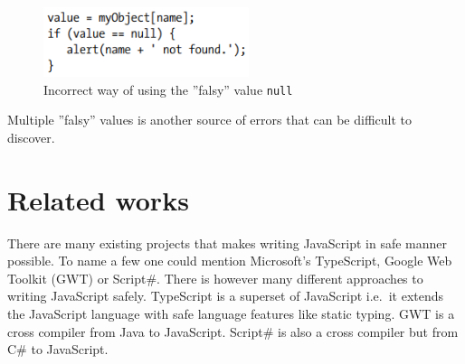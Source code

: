 					\begin{figure}[H]
				\begin{center}
					\centerline{\includegraphics[width=6cm]{resources/images/FalsyExample.png}}
				\end{center}
				\caption{Incorrect way of using the ''falsy'' value \texttt{null} \cite{good_parts}}
				\label{falsyExample}
			\end{figure}

		Multiple ''falsy'' values is another source of errors that can be difficult to discover.

\section{Related works} %
\label{sec:related_works}
	There are many existing projects that makes writing JavaScript in safe manner possible. To name a few one could mention Microsoft’s TypeScript, Google Web Toolkit (GWT) or Script\#. There is however many different approaches to writing JavaScript safely. TypeScript is a superset of JavaScript i.e.\ it extends the JavaScript language with safe language features like static typing. GWT is a cross compiler from Java to JavaScript. Script\# is also a cross compiler but from C\# to JavaScript.

